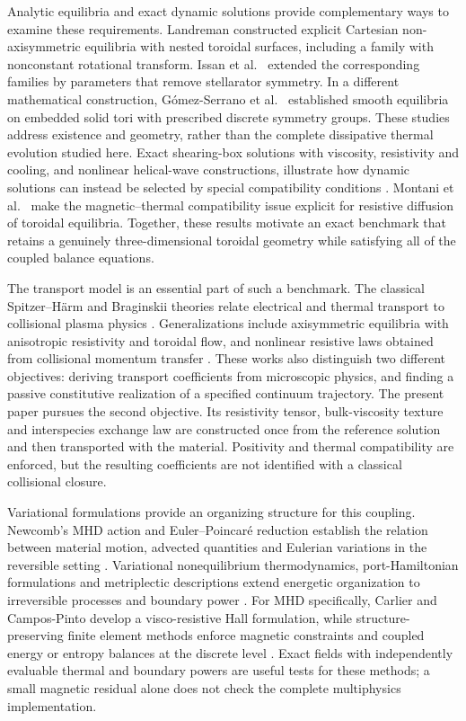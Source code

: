\documentclass[11pt,a4paper]{article}
\theoremstyle{remark}\newtheorem{remark}{Remark}
\numberwithin{equation}{section}
\begin{document}
Analytic equilibria and exact dynamic solutions provide complementary ways to examine these requirements. Landreman \citep{Landreman} constructed explicit Cartesian non-axisymmetric equilibria with nested toroidal surfaces, including a family with nonconstant rotational transform. Issan et al.\ \citep{Issan} extended the corresponding families by parameters that remove stellarator symmetry. In a different mathematical construction, G\'omez-Serrano et al.\ \citep{Gomez2026} established smooth equilibria on embedded solid tori with prescribed discrete symmetry groups. These studies address existence and geometry, rather than the complete dissipative thermal evolution studied here. Exact shearing-box solutions with viscosity, resistivity and cooling, and nonlinear helical-wave constructions, illustrate how dynamic solutions can instead be selected by special compatibility conditions \citep{Lesaffre2007,Zhu2014}. Montani et al.\ \citep{Montani} make the magnetic--thermal compatibility issue explicit for resistive diffusion of toroidal equilibria. Together, these results motivate an exact benchmark that retains a genuinely three-dimensional toroidal geometry while satisfying all of the coupled balance equations.

The transport model is an essential part of such a benchmark. The classical Spitzer--H\"arm and Braginskii theories relate electrical and thermal transport to collisional plasma physics \citep{Spitzer,Braginskii1965}. Generalizations include axisymmetric equilibria with anisotropic resistivity and toroidal flow, and nonlinear resistive laws obtained from collisional momentum transfer \citep{Poulipoulis,Lingam}. These works also distinguish two different objectives: deriving transport coefficients from microscopic physics, and finding a passive constitutive realization of a specified continuum trajectory. The present paper pursues the second objective. Its resistivity tensor, bulk-viscosity texture and interspecies exchange law are constructed once from the reference solution and then transported with the material. Positivity and thermal compatibility are enforced, but the resulting coefficients are not identified with a classical collisional closure.

Variational formulations provide an organizing structure for this coupling. Newcomb's MHD action and Euler--Poincar\'e reduction establish the relation between material motion, advected quantities and Eulerian variations in the reversible setting \citep{Newcomb1962,Holm1998}. Variational nonequilibrium thermodynamics, port-Hamiltonian formulations and metriplectic descriptions extend energetic organization to irreversible processes and boundary power \citep{GayBalmaz2017a,GayBalmaz2017b,PortHamiltonian,Materassi2012,Coquinot2020}. For MHD specifically, Carlier and Campos-Pinto \citep{Carlier} develop a visco-resistive Hall formulation, while structure-preserving finite element methods enforce magnetic constraints and coupled energy or entropy balances at the discrete level \citep{Gawlik2021,Gawlik2025}. Exact fields with independently evaluable thermal and boundary powers are useful tests for these methods; a small magnetic residual alone does not check the complete multiphysics implementation.
\end{document}
